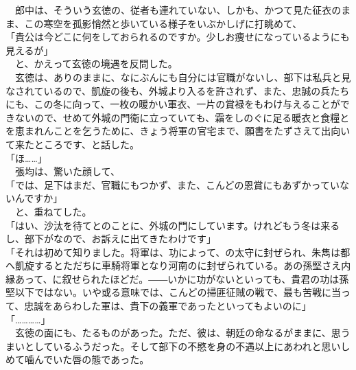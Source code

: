 \documentclass[
  paper=a5,
  fontsize=10pt,
  jafontsize=9.5pt,
  tate,                  %
  open_bracket_pos=nibu, %
]{jlreq}
\begin{document}
　郎中は、そういう玄徳の、従者も連れていない、しかも、かつて見た征衣のまま、この寒空を孤影悄然と歩いている様子をいぶかしげに打眺めて、\\


「貴公は今どこに何をしておられるのですか。少しお痩せになっているようにも見えるが」\\


　と、かえって玄徳の境遇を反問した。\\


　玄徳は、ありのままに、なにぶんにも自分には官職がないし、部下は私兵と見なされているので、凱旋の後も、外城より入るを許されず、また、忠誠の兵たちにも、この冬に向って、一枚の暖かい軍衣、一片の賞禄をもわけ与えることができないので、せめて外城の門衛に立っていても、霜をしのぐに足る暖衣と食糧とを恵まれんことを乞うために、きょう将軍の官宅まで、願書をたずさえて出向いて来たところです、と話した。\\


「ほ……」\\


　張均は、驚いた顔して、\\


「では、足下はまだ、官職にもつかず、また、こんどの恩賞にもあずかっていないんですか」\\


　と、重ねてした。\\


「はい、沙汰を待てとのことに、外城の門にしています。けれどもう冬は来るし、部下がなので、お訴えに出てきたわけです」\\


「それは初めて知りました。将軍は、功によって、の太守に封ぜられ、朱雋は都へ凱旋するとただちに車騎将軍となり河南のに封ぜられている。あの孫堅さえ内縁あって、に叙せられたほどだ。――いかに功がないといっても、貴君の功は孫堅以下ではない。いや或る意味では、こんどの掃匪征賊の戦で、最も苦戦に当って、忠誠をあらわした軍は、貴下の義軍であったといってもよいのに」\\


「…………」\\


　玄徳の面にも、たるものがあった。ただ、彼は、朝廷の命なるがままに、思うまいとしているふうだった。そして部下の不愍を身の不遇以上にあわれと思いしめて噛んでいた唇の態であった。\\
\end{document}
